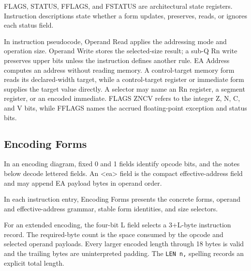 FLAGS, STATUS, FFLAGS, and FSTATUS are architectural state registers. Instruction descriptions state whether a
form updates, preserves, reads, or ignores each status field.

In instruction pseudocode, Operand Read applies the addressing mode and operation size. Operand Write stores the
selected-size result; a sub-Q Rn write preserves upper bits unless the instruction defines another rule. EA Address
computes an address without reading memory. A control-target memory form reads its declared-width target, while a
control-target register or immediate form supplies the target value directly. A selector may name an Rn register, a
segment register, or an encoded immediate. FLAGS ZNCV refers to the integer Z, N, C, and V bits, while FFLAGS names
the accrued floating-point exception and status bits.

\subsection*{Encoding Forms}
In an encoding diagram, fixed 0 and 1 fields identify opcode bits, and the notes below decode lettered fields. An
<ea> field is the compact effective-address field and may append EA payload bytes in operand order.

In each instruction entry, Encoding Forms presents the concrete forms, operand and
effective-address grammar, stable form identities, and size selectors.

For an extended encoding, the four-bit L field selects a 3+L-byte instruction record. The required-byte count is the
space consumed by the opcode and selected operand payloads. Every larger encoded length through 18 bytes is
valid and the trailing bytes are uninterpreted padding. The \texttt{LEN n,} spelling records an explicit total length.
\endgroup
\clearpage
